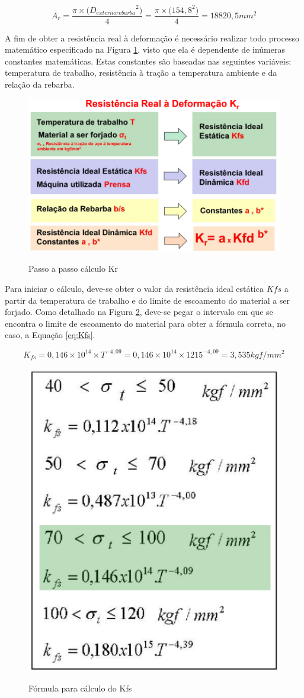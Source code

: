 \documentclass[deposito, acronym, symbols]{fei}
\begin{document}
\begin{equation}
    \label{eq:Ar} 
    A_{r}= \frac{\pi\times({{D_{externo rebarba}}^{2})}}{4} = \frac{\pi\times({{154,8}^{2})}}{4} = 18820,5 mm^2
\end{equation} 

A fim de obter a resistência real à deformação é necessário realizar todo processo matemático especificado na Figura \ref{fig:Kr}, visto que ela é dependente de inúmeras constantes matemáticas. Estas constantes são baseadas nas seguintes variáveis: temperatura de trabalho, resistência à tração a temperatura ambiente e da relação da rebarba.

\begin{figure}[!htp]
    \centering
    \caption{Passo a passo cálculo Kr}
    \includegraphics[width=0.6\linewidth]{Imagens/Kr.png}
    \label{fig:Kr}
\end{figure}

Para iniciar o cálculo, deve-se obter o valor da resistência ideal estática $Kfs$ a partir da temperatura de trabalho e do limite de escoamento do material a ser forjado. Como detalhado na Figura \ref{fig:Kfs}, deve-se pegar o intervalo em que se encontra o limite de escoamento do material para obter a fórmula correta, no caso, a Equação \ref{eq:Kfs}.

\begin{equation}
    \label{eq:Kfs}
    K_{fs}= 0,146\times 10^{14} \times T^{-4,09}=0,146\times 10^{14} \times 1215^{-4,09}=3,535 kgf/mm^2
\end{equation} 

\begin{figure}[!htp]
    \centering
    \caption{Fórmula para cálculo do Kfs}
    \includegraphics[width=0.3\linewidth]{Imagens/Kfs.png}
    \label{fig:Kfs}
\end{figure}
\end{document}

